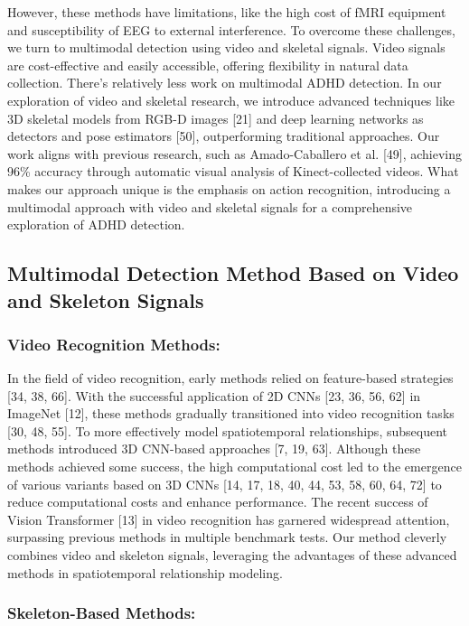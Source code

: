 \documentclass[conference,a4paper,english]{IEEEtran}[2015/08/26]
\begin{document}
However, these methods have limitations, like the high cost of fMRI equipment and susceptibility of 
EEG to external interference. To overcome these challenges, we turn to multimodal detection using video and skeletal signals. 
Video signals are cost-effective and easily accessible, offering flexibility in natural data collection. 
There's relatively less work on multimodal ADHD detection. In our exploration of video and skeletal research, we introduce advanced techniques like 3D skeletal 
models from RGB-D images [21] and deep learning networks as detectors and pose estimators [50], 
outperforming traditional approaches. Our work aligns with previous research, such as Amado-Caballero et 
al. [49], achieving 96\% accuracy through automatic visual analysis of Kinect-collected videos. 
What makes our approach unique is the emphasis on action recognition, introducing a 
multimodal approach with video and skeletal signals for a comprehensive exploration of ADHD detection.


\subsection{Multimodal Detection Method Based on Video and Skeleton Signals
}
\subsubsection{Video Recognition Methods:}


In the field of video recognition, early methods relied on feature-based strategies [34, 38, 66]. With the successful application of 2D CNNs [23, 36, 56, 62] in ImageNet [12], these methods gradually transitioned into video recognition tasks [30, 48, 55]. To more effectively model spatiotemporal relationships, subsequent methods introduced 3D CNN-based approaches [7, 19, 63]. Although these methods achieved some success, the high computational cost led to the emergence of various variants based on 3D CNNs [14, 17, 18, 40, 44, 53, 58, 60, 64, 72] to reduce computational costs and enhance performance. The recent success of Vision Transformer [13] in video recognition has garnered widespread attention, surpassing previous methods in multiple benchmark tests. Our method cleverly combines video and skeleton signals, leveraging the advantages of these advanced methods in spatiotemporal relationship modeling.
\subsubsection{Skeleton-Based Methods:}
\end{document}
